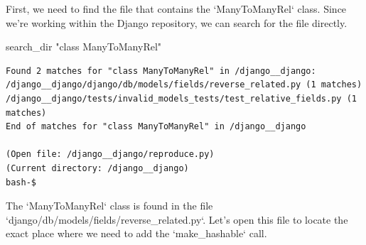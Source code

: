 {\begin{agentbox}
First, we need to find the file that contains the `ManyToManyRel` class. Since we're working within the Django repository, we can search for the file directly.



\hrulefill
\begin{CodeVerbatim}[breaklines=true, breakanywhere=true]
search_dir "class ManyToManyRel"
\end{CodeVerbatim}
\end{agentbox}
\begin{observationbox}\begin{Verbatim}[breaklines=true, breakanywhere=true]
Found 2 matches for "class ManyToManyRel" in /django__django:
/django__django/django/db/models/fields/reverse_related.py (1 matches)
/django__django/tests/invalid_models_tests/test_relative_fields.py (1 matches)
End of matches for "class ManyToManyRel" in /django__django

(Open file: /django__django/reproduce.py)
(Current directory: /django__django)
bash-$
\end{Verbatim}
\end{observationbox}
\begin{agentbox}
The `ManyToManyRel` class is found in the file `django/db/models/fields/reverse\_related.py`. Let's open this file to locate the exact place where we need to add the `make\_hashable` call.




\end{agentbox}}
